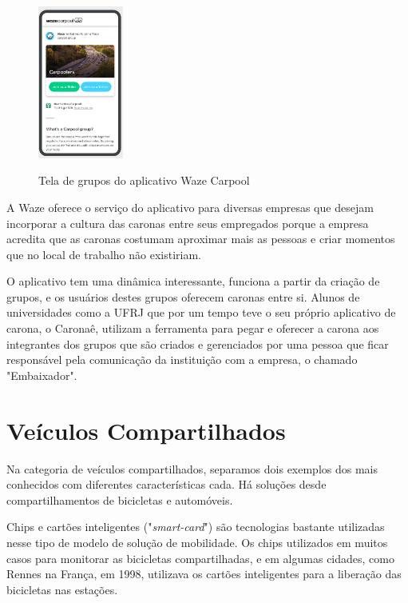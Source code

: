 \begin{figure}[!hbtp]
	\centering
	\caption{Tela de grupos do aplicativo Waze Carpool}
	\includegraphics[width=0.25\textwidth]{./04-figuras/waze/Tela_de_grupos.png}
	\label{fig:tela_grupos_wazecarpool}
\end{figure}

A Waze oferece o serviço do aplicativo para diversas empresas que desejam incorporar a cultura das caronas entre seus empregados porque a empresa acredita que as caronas costumam aproximar mais as pessoas e criar momentos que no local de trabalho não existiriam.

O aplicativo tem uma dinâmica interessante, funciona a partir da criação de grupos, e os usuários destes grupos oferecem caronas entre si. Alunos de universidades como a UFRJ que por um tempo teve o seu próprio aplicativo de carona, o Caronaê, utilizam a ferramenta para pegar e oferecer a carona aos integrantes dos grupos que são criados e gerenciados por uma pessoa que ficar responsável pela comunicação da instituição com a empresa, o chamado "Embaixador".




\section{Veículos Compartilhados}
Na categoria de veículos compartilhados, separamos dois exemplos dos mais conhecidos com diferentes características cada. Há soluções desde compartilhamentos de bicicletas e automóveis.  %

Chips e cartões inteligentes ("\textit{smart-card}") são tecnologias bastante utilizadas nesse tipo de modelo de solução de mobilidade. Os chips utilizados em muitos casos para monitorar as bicicletas compartilhadas, e em algumas cidades, como Rennes na França, em 1998, utilizava os cartões inteligentes para a liberação das bicicletas nas estações.%

